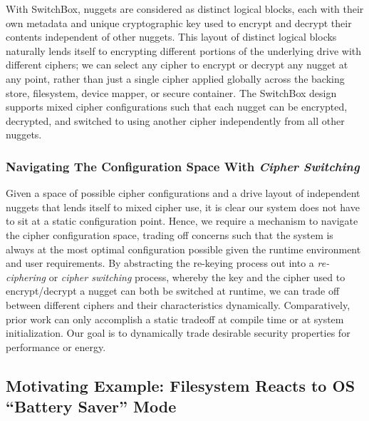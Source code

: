 With SwitchBox, nuggets are considered as distinct logical blocks, each with
their own metadata and unique cryptographic key used to encrypt and decrypt
their contents independent of other nuggets. This layout of distinct logical
blocks naturally lends itself to encrypting different portions of the underlying
drive with different ciphers; we can select any cipher to encrypt or decrypt any
nugget at any point, rather than just a single cipher applied globally across
the backing store, filesystem, device mapper, or secure container. The SwitchBox
design supports mixed cipher configurations such that each nugget can be
encrypted, decrypted, and switched to using another cipher independently from
all other nuggets.

\subsubsection{Navigating The Configuration Space With \emph{Cipher Switching}}

Given a space of possible cipher configurations and a drive layout of
independent nuggets that lends itself to mixed cipher use, it is clear our
system does not have to sit at a static configuration point. Hence, we require a
mechanism to navigate the cipher configuration space, trading off concerns such
that the system is always at the most optimal configuration possible given the
runtime environment and user requirements. By abstracting the re-keying process
out into a \emph{re-ciphering} or \emph{cipher switching} process, whereby the
key and the cipher used to encrypt/decrypt a nugget can both be switched at
runtime, we can trade off between different ciphers and their characteristics
dynamically. Comparatively, prior work can only accomplish a static tradeoff at
compile time or at system initialization. Our goal is to dynamically trade
desirable security properties for performance or energy.

\subsection{Motivating Example: Filesystem Reacts to OS ``Battery Saver'' Mode}


